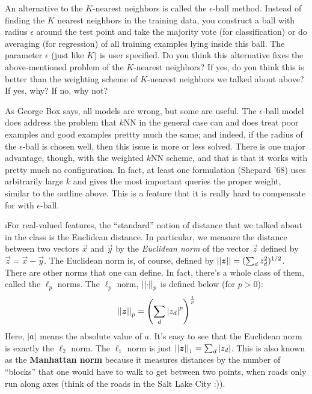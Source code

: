 \documentclass[fleqn]{article}
\begin{document}
An alternative to the $K$-nearest neighbors is called the $\epsilon$-ball
method. Instead of finding the $K$ nearest neighbors in the training 
data, you construct a ball with radius $\epsilon$ around the test point
and take the majority vote (for classification) or do averaging (for regression)
of all training examples lying inside this ball. The parameter $\epsilon$ (just 
like $K$) is user specified. Do you think this alternative fixes the 
above-mentioned problem of the $K$-nearest neighbors? If yes, do you think this 
is better than the weighting scheme of $K$-nearest neighbors we talked about 
above? If yes, why? If no, why not?

\begin{solution}
As George Box says, all models are wrong, but some are useful. The $\epsilon$-ball model does address the problem that $k$NN in the general case can and does treat poor examples and good examples prettty much the same; and indeed, if the radius of the $\epsilon$-ball is chosen well, then this issue is more or less solved. There is one major advantage, though, with the weighted $k$NN scheme, and that is that it works with pretty much no configuration. In fact, at least one formulation (Shepard '68) uses arbitrarily large $k$ and gives the most important queries the proper weight, similar to the outline above. This is a feature that it is really hard to compensate for with $\epsilon$-ball.
\end{solution}


\i For real-valued features, the ``standard'' notion of distance 
that we talked about in the class is the Euclidean distance. 
In particular, we measure the distance between two vectors $\vec x$ 
and $\vec y$ by the \emph{Euclidean norm} of the vector $\vec z$ 
defined by $\vec z = \vec x - \vec y$.  The Euclidean norm is, of 
course, defined by $\left\vert\left\vert \boldsymbol{z} \right\vert\right\vert = (\sum_d z_d^2)^{1/2}$.  There 
are other norms that one can define.  In fact,
there's a whole class of them, called the $\ell_p$ norms.  The
$\ell_p$ norm, $\left\vert\left\vert \cdot \right\vert\right\vert_p$ is defined below (for $p>0$):
\begin{equation*}
\left\vert\left\vert \boldsymbol{z} \right\vert\right\vert_p = \left(\sum_d \left\vert z_d \right\vert^p\right)^{\frac 1 p}
\end{equation*}
Here, $\left\vert a \right\vert$ means the absolute value of $a$.  It's easy to see that
the Euclidean norm is exactly the $\ell_2$ norm.  The $\ell_1$ norm is
just $\left\vert\left\vert \boldsymbol{z} \right\vert\right\vert_1 = \sum_d \left\vert z_d \right\vert$.  This is also known as the
\textbf{Manhattan norm} because it measures distances by the number of
``blocks'' that one would have to walk to get between two points, when
roads only run along axes (think of the roads in the Salt Lake City :)).
\end{document}
